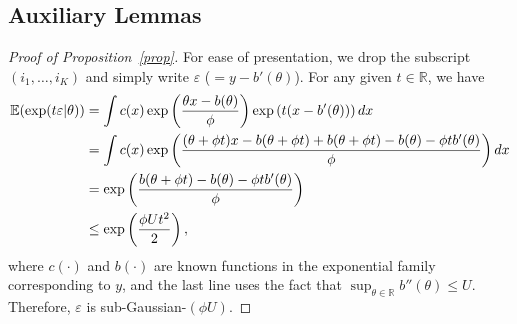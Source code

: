 \documentclass[12pt]{article}
\theoremstyle{definition}
\begin{document}
\subsection{Auxiliary Lemmas}\label{sec:lemma}
\begin{proof}[Proof of Proposition~\ref{prop}]For ease of presentation, we drop the subscript $(i_1,\ldots,i_K)$ and simply write $\varepsilon$ ($=y-b'(\theta)$). For any given $t\in\mathbb{R}$, we have
\begin{align}
\mathbb{E}(\exp(t\varepsilon|\theta))&=\int c(x) \exp\left({\theta x - b(\theta)\over \phi}   \right)\exp \left(t(x-b'(\theta))\right)dx\\
&=\int c(x)\exp \left( {(\theta + \phi t)x - b (\theta+\phi t)+b(\theta+\phi t)-b(\theta)-\phi t b'(\theta) \over \phi}\right)dx\\
&=\exp\left( {b(\theta+\phi t)-b(\theta)-\phi t b'(\theta) \over \phi} \right)\\
&\leq \exp\left(\phi U t^2\over 2 \right),
\end{align}
where $c(\cdot)$ and $b(\cdot)$ are known functions in the exponential family corresponding to $y$, and the last line uses the fact that $\sup_{\theta\in\mathbb{R}}b''(\theta)\leq U$. 
Therefore, $\varepsilon$ is sub-Gaussian-$(\phi U)$. \end{proof}
\end{document}
